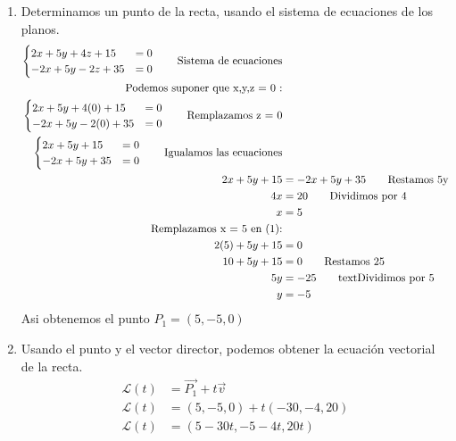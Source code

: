 \documentclass{templateNote}
\begin{document}
\begin{enumerate}
    \item Determinamos un punto de la recta, usando el sistema de ecuaciones de los planos.
    \begin{align*}
        \begin{cases}
            2x + 5y + 4z + 15 &= 0 \\
            -2x + 5y - 2z + 35 &= 0
        \end{cases} \tag*{\text{Sistema de ecuaciones}} \\
        \textrm{Podemos suponer que x,y,z = 0 :} \\
        \begin{cases}
            2x + 5y + 4(0) + 15 &= 0 \\
            -2x + 5y - 2(0) + 35 &= 0
        \end{cases} \tag*{\text{Remplazamos z = 0}} \\
        \begin{cases}
            2x + 5y + 15 &= 0 \\
            -2x + 5y + 35 &= 0
        \end{cases} \tag*{\text{Igualamos las ecuaciones}} \\
        2x + 5y + 15 &= -2x + 5y + 35 \tag*{\text{Restamos 5y}}\\
        4x &= 20 \tag*{\text{Dividimos por 4}}\\
        x &= 5 && \\
        \textrm{Remplazamos x = 5 en (1):} \\
        2(5) + 5y + 15 &= 0\\
        10 + 5y + 15 &= 0 \tag*{\text{Restamos 25}}\\
        5y &= -25 \tag*{text{Dividimos por 5}}\\
        y &= -5
    \end{align*}
    Asi obtenemos el punto $P_1 = (5, -5, 0)$

    \newpage
    \item Usando el punto y el vector director, podemos obtener la ecuación vectorial de la recta.
    \begin{align*}
        \mathcal{L}(t) &= \overrightarrow{P_1} + t\overrightarrow{v} \\
        \mathcal{L}(t) &= (5, -5, 0) + t(-30, -4, 20) \\
        \mathcal{L}(t) &= (5 - 30t, -5 - 4t, 20t)
    \end{align*}
\end{enumerate}
\end{document}
